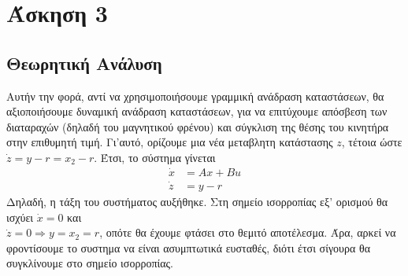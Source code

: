 \section{Άσκηση 3}
\subsection{Θεωρητική Ανάλυση}
Αυτήν την φορά, αντί να χρησιμοποιήσουμε γραμμική ανάδραση καταστάσεων, θα αξιοποιήσουμε δυναμική ανάδραση καταστάσεων, για να επιτύχουμε απόσβεση των διαταραχών (δηλαδή του μαγνητικού φρένου) και σύγκλιση της θέσης του κινητήρα στην επιθυμητή τιμή. Γι'αυτό, ορίζουμε μια νέα μεταβλητη κατάστασης $z$, τέτοια ώστε $\dot{z} = y - r = x_2 - r$. Έτσι, το σύστημα γίνεται
\begin{align*}
	\dot{x} &= Ax + Bu \\
	\dot{z} &= y - r
\end{align*}
Δηλαδή, η τάξη του συστήματος αυξήθηκε. Στη σημείο ισορροπίας εξ' ορισμού θα ισχύει $\dot{x} = 0$ και \\$\dot{z} = 0 \Rightarrow y = x_2 = r$, οπότε θα έχουμε φτάσει στο θεμιτό αποτέλεσμα. Άρα, αρκεί να φροντίσουμε το συστημα να είναι ασυμπτωτικά ευσταθές, διότι έτσι σίγουρα θα συγκλίνουμε στο σημείο ισορροπίας. 

